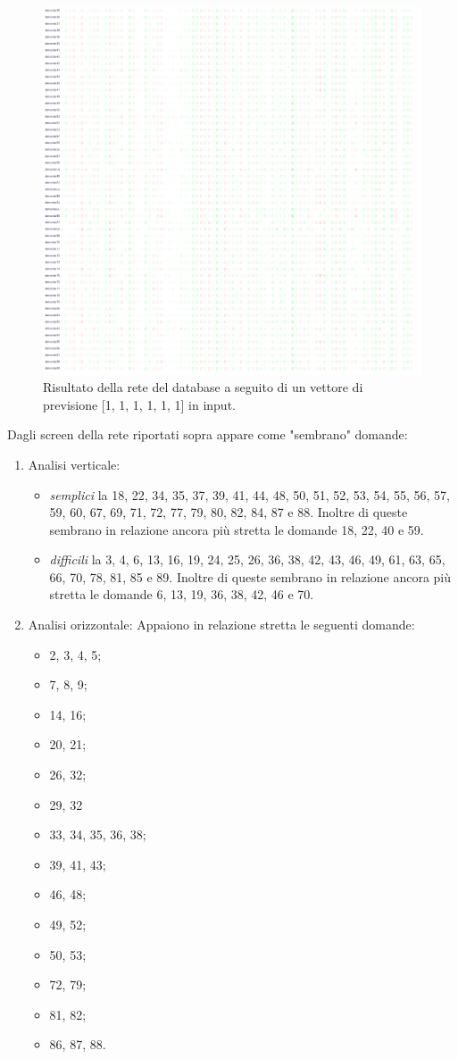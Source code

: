 \begin{figure}[H]
\centering
	\includegraphics[width=0.90\linewidth]{./image/rete_db-vp1_2.png}
	\caption{Risultato della rete del database a seguito di un vettore di previsione [1, 1, 1, 1, 1, 1] in input.}
\end{figure}

Dagli screen della rete riportati sopra appare come "sembrano" domande:
\begin{enumerate}
\item Analisi verticale:
\begin{itemize}
\item \textit{semplici} la 18, 22, 34, 35, 37, 39, 41, 44, 48, 50, 51, 52, 53, 54, 55, 56, 57, 59, 60, 67, 69,  71, 72, 77, 79, 80, 82, 84, 87 e 88. Inoltre di queste sembrano in relazione ancora pi\`u stretta le domande 18, 22, 40 e 59.
\item \textit{difficili} la 3, 4, 6, 13, 16, 19, 24, 25, 26, 36, 38, 42, 43, 46, 49, 61, 63, 65, 66, 70, 78, 81, 85 e 89. Inoltre di queste sembrano in relazione ancora pi\`u stretta le domande 6, 13, 19, 36, 38, 42, 46 e 70.
\end{itemize}
\item Analisi orizzontale:
Appaiono in relazione stretta le seguenti domande:
\begin{itemize}
\item 2, 3, 4, 5;
\item 7, 8, 9;
\item 14, 16;
\item 20, 21;
\item 26, 32;
\item 29, 32
\item 33, 34, 35, 36, 38;
\item 39, 41, 43;
\item 46, 48;
\item 49, 52;
\item 50, 53;
\item 72, 79;
\item 81, 82;
\item 86, 87, 88.
\end{itemize}
\end{enumerate}

